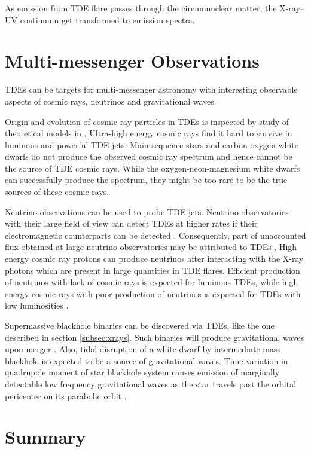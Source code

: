 \documentclass{tda}
\begin{document}
As emission from TDE flare passes through the circumnuclear matter, the X-ray--UV continuum get transformed to emission spectra.


\section{Multi-messenger Observations}
TDEs can be targets for multi-messenger astronomy with interesting observable aspects of cosmic rays, neutrinos and gravitational waves.

Origin and evolution of cosmic ray particles in TDEs is inspected by study of theoretical models in \cite{zhang_high-energy_2017}. Ultra-high energy cosmic rays find it hard to survive in luminous and powerful TDE jets. Main sequence stars and carbon-oxygen white dwarfs do not produce the observed cosmic ray spectrum and hence cannot be the source of TDE cosmic rays. While the oxygen-neon-magnesium white dwarfs can successfully produce the spectrum, they might be too rare to be the true sources of these cosmic rays.

Neutrino observations can be used to probe TDE jets. Neutrino observatories with their large field of view can detect TDEs at higher rates if their electromagnetic counterparts can be detected \cite{wang_probing_2011}. Consequently, part of unaccounted flux obtained at large neutrino observatories may be attributed to TDEs \cite{lunardini_high_2017}. High energy cosmic ray protons can produce neutrinos after interacting with the X-ray photons which are present in large quantities in TDE flares. Efficient production of neutrinos with lack of cosmic rays is expected for luminous TDEs, while high energy cosmic rays with poor production of neutrinos is expected for TDEs with low luminosities \cite{zhang_high-energy_2017}. 

Supermassive blackhole binaries can be discovered via TDEs, like the one described in section \ref{subsec:xrays}. Such binaries will produce gravitational waves upon merger \cite{komossa_tidal_2015}. Also, tidal disruption of a white dwarf by intermediate mass blackhole is expected to be a source of gravitational waves. Time variation in quadrupole moment of star blackhole system causes emission of marginally detectable low frequency gravitational waves as the star travels past the orbital pericenter on its parabolic orbit \cite{kobayashi_gravitational_2004} \cite{nicholas_chamberlain_stone_tidal_2013}.  

\section{Summary}

\printbibliography
\end{document}
